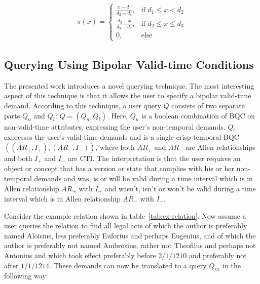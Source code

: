 \documentclass[runningheads,a4paper]{llncs}
\begin{document}
\vspace{-10pt}
\begin{align}
\pi(x) =
\begin{cases}
\frac{x - d_1}{d_2 - d_1}, & \text{if } d_1 \leq x < d_2 \\
\frac{d_3 - x}{d_3 - d_2}, & \text{if } d_2 \leq x \leq d_3 \\
0, & \text{else}
\end{cases}
\end{align}
\vspace{-15pt}

\subsection{Querying Using Bipolar Valid-time Conditions \label{sec:query}}
The presented work introduces a novel querying technique. The most interesting aspect of this technique is that it allows the user to specify a bipolar valid-time demand. According to this technique, a user query $Q$ consists of two separate parts $Q_n$ and $Q_t$: $Q = (Q_n, Q_t)$. Here, $Q_n$ is a boolean combination of BQC on non-valid-time attributes, expressing the user's non-temporal demands. $Q_t$ expresses the user's valid-time demands and is a single crisp temporal BQC $((AR_{+}, I_{+}), (AR_{-}, I_{-}))$, where both $AR_{+}$ and $AR_{-}$ are Allen relationships and both $I_{+}$ and $I_{-}$ are CTI. The interpretation is that the user requires an object or concept that has a version or state that complies with his or her non-temporal demands and was, is or will be valid during a time interval which is in Allen relationship $AR_{+}$ with $I_{+}$ and wasn't, isn't or won't be valid during a time interval which is in Allen relationship $AR_{-}$ with $I_{-}$.

Consider the example relation shown in table~\ref{tab:ex-relation}. Now assume a user queries the relation to find all legal acts of which the author is preferably named Alo\"isius, less preferably Euforius and perhaps Eugenius, and of which the author is preferably not named Ambrosius, rather not Theofilus and perhaps not Antonius and which took effect preferably before $2/1/1210$ and preferably not after $1/1/1214$. These demands can now be translated to a query $Q_{ex}$ in the following way:
\end{document}
